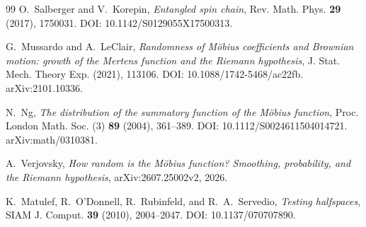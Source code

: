 \documentclass[11pt]{amsart}
\numberwithin{equation}{section}
\theoremstyle{plain}
\theoremstyle{definition}
\theoremstyle{remark}
\begin{document}
\begin{thebibliography}{99}
O.~Salberger and V.~Korepin,
\emph{Entangled spin chain},
Rev. Math. Phys. \textbf{29} (2017), 1750031.
DOI: 10.1142/S0129055X17500313.

G.~Mussardo and A.~LeClair,
\emph{Randomness of M\"obius coefficients and Brownian motion: growth of the Mertens function and the Riemann hypothesis},
J. Stat. Mech. Theory Exp. (2021), 113106.
DOI: 10.1088/1742-5468/ac22fb.
arXiv:2101.10336.

N.~Ng,
\emph{The distribution of the summatory function of the M\"obius function},
Proc. London Math. Soc. (3) \textbf{89} (2004), 361--389.
DOI: 10.1112/S0024611504014721.
arXiv:math/0310381.

A.~Verjovsky,
\emph{How random is the M\"obius function? Smoothing, probability, and the Riemann hypothesis},
arXiv:2607.25002v2, 2026.

K.~Matulef, R.~O'Donnell, R.~Rubinfeld, and R.~A.~Servedio,
\emph{Testing halfspaces},
SIAM J. Comput. \textbf{39} (2010), 2004--2047.
DOI: 10.1137/070707890.

\end{thebibliography}
\end{document}
